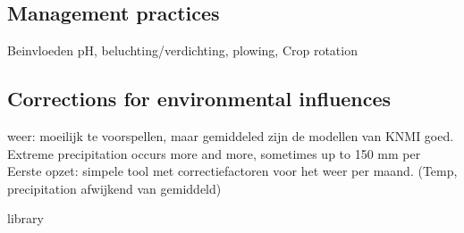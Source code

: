 \documentclass[10pt,twoside,dutch,english]{report}
\begin{document}
\subsection{Management practices}
Beinvloeden pH, beluchting/verdichting, plowing, Crop rotation


    
    \subsection{Corrections for environmental influences}
	weer: moeilijk te voorspellen, maar gemiddeled zijn de modellen van KNMI goed. Extreme precipitation occurs more and more, sometimes up to 150 mm per
    Eerste opzet: simpele tool met correctiefactoren voor het weer per maand. (Temp, precipitation afwijkend van gemiddeld)



\linespread{1.0}
\footnotesize 
{}

 {library}
\normalsize 
\linespread{1.3}
\end{document}
